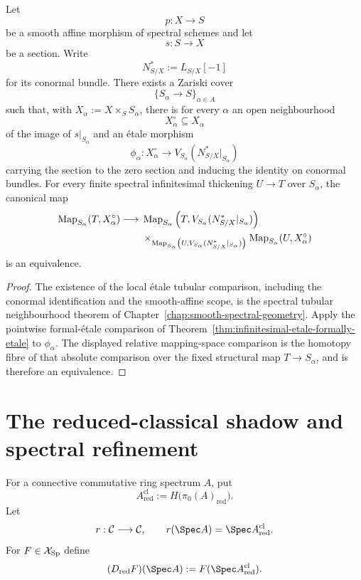 \begin{theorem}
\label{thm:infinitesimal-tubular-linearization}
Let
\[
    p:X\longrightarrow S
\]
be a smooth affine morphism of spectral schemes and let
\[
    s:S\longrightarrow X
\]
be a section.  Write
\[
    N^*_{S/X}:=L_{S/X}[-1]
\]
for its conormal bundle.  There exists a Zariski cover
\[
    \{S_\alpha\longrightarrow S\}_{\alpha\in A}
\]
such that, with $X_\alpha:=X\times_SS_\alpha$, there is for every $\alpha$ an
open neighbourhood
\[
    X_\alpha^\circ\subseteq X_\alpha
\]
of the image of $s|_{S_\alpha}$ and an \'etale morphism
\[
    \phi_\alpha:
    X_\alpha^\circ
    \longrightarrow
    V_{S_\alpha}(N^*_{S/X}|_{S_\alpha})
\]
carrying the section to the zero section and inducing the identity on
conormal bundles.  For every finite spectral infinitesimal thickening
$U\to T$ over $S_\alpha$, the canonical map
\[
\begin{aligned}
    \operatorname{Map}_{S_\alpha}(T,X_\alpha^\circ)
    \longrightarrow{}
    &\operatorname{Map}_{S_\alpha}
      \left(T,V_{S_\alpha}(N^*_{S/X}|_{S_\alpha})\right)\\
    &\times_{
      \operatorname{Map}_{S_\alpha}
      \left(U,V_{S_\alpha}(N^*_{S/X}|_{S_\alpha})\right)}
      \operatorname{Map}_{S_\alpha}(U,X_\alpha^\circ)
\end{aligned}
\]
is an equivalence.
\end{theorem}

\begin{proof}
The existence of the local \'etale tubular comparison, including the
conormal identification and the smooth-affine scope, is the spectral tubular
neighbourhood theorem of Chapter~\ref{chap:smooth-spectral-geometry}.  Apply
the pointwise formal-\'etale comparison of
Theorem~\ref{thm:infinitesimal-etale-formally-etale} to $\phi_\alpha$.  The
displayed relative mapping-space comparison is the homotopy fibre of that
absolute comparison over the fixed structural map $T\to S_\alpha$, and is
therefore an equivalence.
\end{proof}

\section{The reduced-classical shadow and spectral refinement}
\label{sec:infinitesimal-reduced-comparison}

\begin{definition}
\label{def:infinitesimal-reduced-test}
For a connective commutative ring spectrum $A$, put
\[
    A_{\mathrm{red}}^{\mathrm{cl}}
    :=
    H\bigl(\pi_0(A)_{\mathrm{red}}\bigr).
\]
Let
\[
    r:\mathcal C\longrightarrow\mathcal C,
    \qquad
    r(\Spec A)=\Spec A_{\mathrm{red}}^{\mathrm{cl}}.
\]
For $F\in\mathcal X_{\mathrm{Sp}}$ define
\[
    (D_{\mathrm{red}}F)(\Spec A)
    :=
    F(\Spec A_{\mathrm{red}}^{\mathrm{cl}}).
\]
\end{definition}

